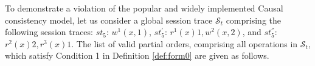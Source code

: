 \documentclass[journal,compsoc]{IEEEtran}
\begin{document}
 \par To demonstrate
 a violation of the popular and widely implemented Causal consistency model, let us consider a global session trace $\mathcal{S}_t$ comprising the following session traces: $\mathit{st}_5$: $w^1(x,1)$, %
 $\mathit{st}_5^{'}$: $r^1(x){1}, w^2(x,2)$, %
 and  $\mathit{st}_5^{''}$: $r^2(x){2}, r^3(x){1}$. The list of valid partial orders, comprising all operations in $\mathcal{S}_t$, which satisfy Condition 1 in Definition \ref{def:form0} are given as follows.   
\end{document}
